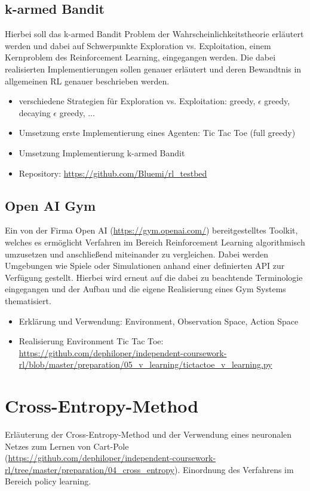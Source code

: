 \documentclass[11pt]{scrartcl}
\begin{document}
\subsection{k-armed Bandit}
Hierbei soll das k-armed Bandit Problem der Wahrscheinlichkeitstheorie erläutert werden und dabei auf  Schwerpunkte Exploration vs. Exploitation, einem Kernproblem des Reinforcement Learning, eingegangen werden. Die dabei realisierten Implementierungen sollen genauer erläutert und deren Bewandtnis in allgemeinen RL genauer beschrieben werden.  
\begin{itemize}
\itemsep0pt
\item verschiedene Strategien für Exploration vs. Exploitation: greedy, $\epsilon$ greedy, decaying $\epsilon$ greedy, ...
\item Umsetzung erste Implementierung eines Agenten: Tic Tac Toe (full greedy)
\item Umsetzung Implementierung k-armed Bandit
\item Repository: \url{https://github.com/Bluemi/rl_testbed}
\end{itemize}

\subsection{Open AI Gym}
Ein von der Firma Open AI (\url{https://gym.openai.com/}) bereitgestelltes Toolkit, welches es ermöglicht Verfahren im Bereich Reinforcement Learning algorithmisch umzusetzen und anschließend miteinander zu vergleichen. Dabei werden Umgebungen wie Spiele oder Simulationen anhand einer definierten API zur Verfügung gestellt. Hierbei wird erneut auf die dabei zu beachtende Terminologie eingegangen und der Aufbau und die eigene Realisierung eines Gym Systems thematisiert.

\begin{itemize}
\itemsep0pt
\item Erklärung und Verwendung: Environment, Observation Space, Action Space
\item Realisierung Environment Tic Tac Toe:\\ \url{https://github.com/dephiloper/independent-coursework-rl/blob/master/preparation/05_v_learning/tictactoe_v_learning.py}
\end{itemize}

\section{Cross-Entropy-Method}
Erläuterung der Cross-Entropy-Method und der Verwendung eines neuronalen Netzes zum Lernen von Cart-Pole \\ (\url{https://github.com/dephiloper/independent-coursework-rl/tree/master/preparation/04_cross_entropy}). Einordnung des Verfahrens im Bereich policy learning. 
\end{document}

